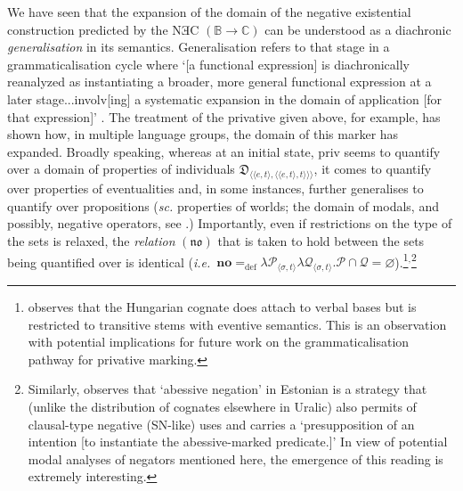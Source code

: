 We have seen that the expansion of the domain of the negative existential construction predicted by the NƎC $(\mathbb{B\to C})$ can be understood as a diachronic \textit{generalisation} in its semantics. Generalisation refers to that stage in a grammaticalisation cycle where `[a functional expression] is diachronically reanalyzed as instantiating a broader, more general functional expression at a later stage...involv[ing] a systematic expansion in the domain of application [for that expression]' \citep[187]{Deo2015}. The treatment of the privative given above, for example, has shown how, in multiple language groups, the domain of this marker has expanded. Broadly speaking, whereas at an initial state, \gls{priv} seems to quantify over a domain of properties of individuals $\mathfrak D_{\langle\langle e,t\rangle ,\langle\langle e,t\rangle,t\rangle\rangle\rangle}$, it comes to quantify over properties of eventualities and, in some instances, further generalises to quantify over propositions  (\textit{sc.} properties of worlds; the domain of modals, and possibly, negative operators, see \citealt[34\textit{ff}]{Horn2017}.) Importantly, even if restrictions on the type of the sets is relaxed, the \textit{relation} $(\boldsymbol{\mathfrak{n\!o}})$ that is taken to hold between the sets being quantified over is identical (\textit{i.e.}~$\mathbf{no}=_{\text{def}}\lambda \mathcal P_{\langle\sigma,t\rangle}\lambda \mathcal Q_{\langle\sigma,t\rangle}.\mathcal P\cap \mathcal Q=\varnothing$).\footnote{
	\citet[609]{Kiefer2015} observes that the Hungarian cognate does attach to verbal bases but is restricted to transitive stems with eventive semantics. This is an observation with potential implications for future work on the grammaticalisation pathway for privative marking.}$^,$\footnote{\label{TammABE}Similarly, \citet[416]{Tamm2015} observes that `abessive negation' in Estonian is a strategy that (unlike the distribution of cognates elsewhere in Uralic) also permits of clausal-type negative (SN-like) uses and carries a `presupposition of an intention [to instantiate the abessive-marked predicate.]' In view of potential modal analyses of negators mentioned here, the emergence of this reading is extremely interesting.}%

